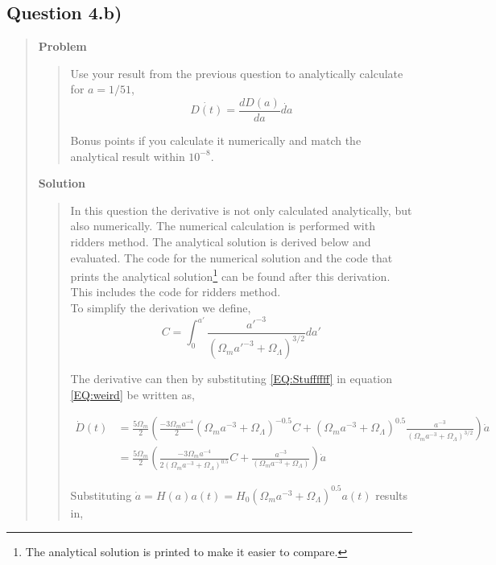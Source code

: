 \newpage
\subsection*{\textbf{Question 4.b)}}
\begin{quote}

\textbf{Problem}
\begin{quote} 
Use your result from the previous question to analytically calculate for $a = 1/51$,
\begin{equation}
\dot{D(t)} = \frac{dD(a)}{da}\dot{da}
\label{EQ:weird}
\end{equation}

Bonus points if you calculate it numerically and match the analytical result within $10^{-8}$. 
\end{quote}

\textbf{Solution} 
\begin{quote}
In this question the derivative is not only calculated analytically, but also numerically. The numerical calculation is performed with ridders method. The analytical solution is derived below and evaluated. The code for the numerical solution and the code that prints the analytical solution\footnote{The analytical solution is printed to make it easier to compare.} can be found after this derivation. This includes the code for ridders method.
\\

To simplify the derivation we define,
\begin{equation}
C = \int_{0}^{a'} \frac{a'^{-3}}{\left( \Omega_m a'^{-3} + \Omega_{\Lambda} \right)^{3/2}} da'
\end{equation}

The derivative can then by substituting \ref{EQ:Stuffffff} in equation \ref{EQ:weird} be written as,

\begin{align}
\dot{D}(t) &= \frac{5 \Omega_m}{2} \left( \frac{-3 \Omega_m a^{-4}}{2} \left(\Omega_m a^{-3} + \Omega_{\Lambda} \right)^{-0.5}C + \left(\Omega_m a^{-3} + \Omega_{\Lambda} \right)^{0.5} \frac{a^{-3}}{\left( \Omega_m a^{-3} + \Omega_{\Lambda} \right)^{3/2} }  \right) \dot{a} \\
&= \frac{5 \Omega_m}{2} \left( \frac{-3 \Omega_m a^{-4}}{2 \left(\Omega_m a^{-3} + \Omega_{\Lambda} \right)^{0.5}}C + \frac{a^{-3}}{\left( \Omega_m a^{-3} + \Omega_{\Lambda} \right)} \right) \dot{a}
\end{align}

Substituting $\dot{a} = H(a)a(t) = H_0 \left(\Omega_m a^{-3}  + \Omega_{\Lambda} \right)^{0.5}a(t)$ results in,


\end{quote}
\end{quote}

